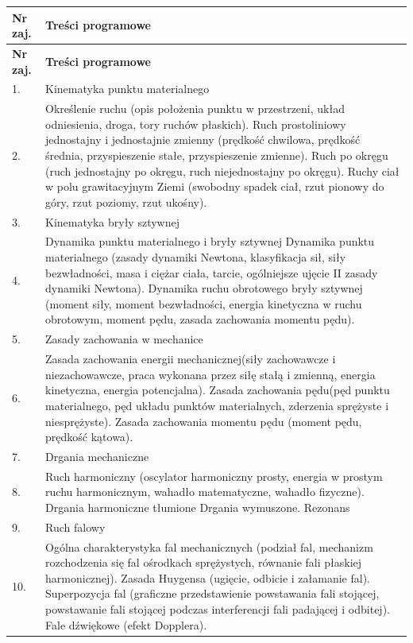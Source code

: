\documentclass[12pt, a4paper]{article}
\newcommand{\thdrule}{\noalign{\global\setlength{\extrarowheight}{0pt}}}
\newcommand{\thdend}{\noalign{\global\setlength{\extrarowheight}{3pt}}}
\begin{document}
{\scriptsize
\begin{longtable}{m{1.5cm}m{14.5cm}}
\thdrule\toprule
\rowcolor{pjatkRed} {\color{white}\textbf{Nr zaj.}} & {\color{white}\textbf{Treści programowe}} \\
\midrule\thdend
\endfirsthead
\thdrule\toprule
\rowcolor{pjatkRed} {\color{white}\textbf{Nr zaj.}} & {\color{white}\textbf{Treści programowe}} \\
\midrule\thdend
\endhead
  \rowcolor{tableRowLight} 1. & Kinematyka punktu materialnego \\
  \rowcolor{tableRowAlt} 2. & Określenie ruchu (opis położenia punktu w przestrzeni, układ odniesienia, droga, tory ruchów płaskich). Ruch prostoliniowy jednostajny i jednostajnie zmienny (prędkość chwilowa, prędkość średnia, przyspieszenie stałe, przyspieszenie zmienne). Ruch po okręgu (ruch jednostajny po okręgu, ruch niejednostajny po okręgu). Ruchy ciał w polu grawitacyjnym Ziemi (swobodny spadek ciał, rzut pionowy do góry, rzut poziomy, rzut ukośny). \\
  \rowcolor{tableRowLight} 3. & Kinematyka bryły sztywnej \\
  \rowcolor{tableRowAlt} 4. & Dynamika punktu materialnego i bryły sztywnej Dynamika punktu materialnego (zasady dynamiki Newtona, klasyfikacja sił, siły bezwładności, masa i ciężar ciała, tarcie, ogólniejsze ujęcie II zasady dynamiki Newtona). Dynamika ruchu obrotowego bryły sztywnej (moment siły, moment bezwładności, energia kinetyczna w ruchu obrotowym, moment pędu, zasada zachowania momentu pędu). \\
  \rowcolor{tableRowLight} 5. & Zasady zachowania w mechanice \\
  \rowcolor{tableRowAlt} 6. & Zasada zachowania energii mechanicznej(siły zachowawcze i niezachowawcze, praca wykonana przez siłę stałą i zmienną, energia kinetyczna, energia potencjalna). Zasada zachowania pędu(pęd punktu materialnego, pęd układu punktów materialnych, zderzenia sprężyste i niesprężyste). Zasada zachowania momentu pędu (moment pędu, prędkość kątowa). \\
  \rowcolor{tableRowLight} 7. & Drgania mechaniczne \\
  \rowcolor{tableRowAlt} 8. & Ruch harmoniczny (oscylator harmoniczny prosty, energia w prostym ruchu harmonicznym, wahadło matematyczne, wahadło fizyczne). Drgania harmoniczne tłumione Drgania wymuszone. Rezonans \\
  \rowcolor{tableRowLight} 9. & Ruch falowy \\
  \rowcolor{tableRowAlt} 10. & Ogólna charakterystyka fal mechanicznych (podział fal, mechanizm rozchodzenia się fal ośrodkach sprężystych, równanie fali płaskiej harmonicznej). Zasada Huygensa (ugięcie, odbicie i załamanie fal). Superpozycja fal (graficzne przedstawienie powstawania fali stojącej, powstawanie fali stojącej podczas interferencji fali padającej i odbitej). Fale dźwiękowe (efekt Dopplera). \\

\end{longtable}}
\end{document}
